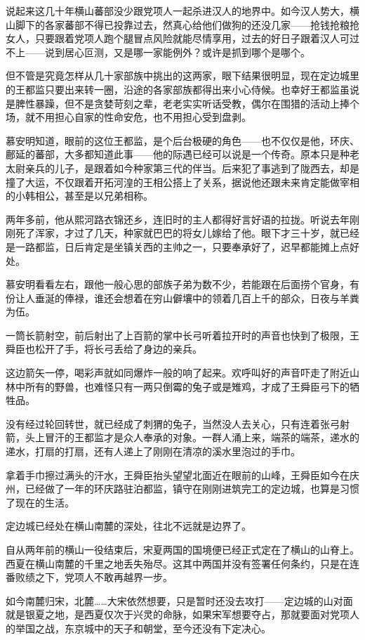 说起来这几十年横山蕃部没少跟党项人一起杀进汉人的地界中。如今汉人势大，横山脚下的各家蕃部不得已投靠过去，然真心给他们做狗的还没几家——抢钱抢粮抢女人，只要跟着党项人跑个腿冒点风险就能尽情享用，过去的好日子跟着汉人可过不上——说到居心叵测，又是哪一家能例外？或许是抓到哪个是哪个。

但不管是究竟怎样从几十家部族中挑出的这两家，眼下结果很明显，现在定边城里的王都监只要出来转一圈，沿途的各家部族都得出来小心侍候。也幸好王都监虽说是脾性暴躁，但不是贪婪苛刻之辈，老老实实听话受教，偶尔在围猎的活动上捧个场，就不用担心自家的性命安危，也不用担心受到盘剥。

慕安明知道，眼前的这位王都监，是个后台极硬的角色——也不仅仅是他，环庆、鄜延的蕃部，大多都知道此事——他的际遇已经可以说是一个传奇。原本只是种老太尉亲兵的儿子，是跟着如今种家第三代的伴当。后来犯了事逃到了陇西去，却是撞了大运，不仅跟着开拓河湟的王相公搭上了关系，据说他还跟未来肯定能做宰相的小韩相公，甚至是以兄弟相称。

两年多前，他从熙河路衣锦还乡，连旧时的主人都得好言好语的拉拢。听说去年刚刚死了浑家，才过了几天，种家就巴巴的将女儿嫁给了他。眼下才三十岁，就已经是一路都监，日后肯定是坐镇关西的主帅之一，只要奉承好了，迟早都能摊上点好处。

慕安明看看左右，跟他一般心思的部族子弟为数不少，若能跟在后面捞个官身，有份让人垂涎的俸禄，谁还会想着在穷山僻壤中的领着几百上千的部众，日夜与羊粪为伍。

一筒长箭射空，前后射出了上百箭的掌中长弓听着拉开时的声音也快到了极限，王舜臣也松开了手，将长弓丢给了身边的亲兵。

这边箭矢一停，喝彩声就如同爆炸一般的响了起来。欢呼叫好的声音吓走了附近山林中所有的野兽，也难怪只有一两只倒霉的兔子或是雉鸡，才成了王舜臣弓下的牺牲品。

没有经过轮回转世，就已经成了刺猬的兔子，当然没人去关心，只有连着张弓射箭，头上冒汗的王都监才是众人奉承的对象。一群人涌上来，端茶的端茶，递水的递水，打扇的打扇，还有人递上了刚刚在清凉的溪水里泡过的手巾。

拿着手巾擦过满头的汗水，王舜臣抬头望望北面近在眼前的山峰，王舜臣如今在庆州，已经做了一年的环庆路驻泊都监，镇守在刚刚进筑完工的定边城，也算是习惯了现在的生活。

定边城已经处在横山南麓的深处，往北不远就是边界了。

自从两年前的横山一役结束后，宋夏两国的国境便已经正式定在了横山的山脊上。西夏在横山南麓的千里之地丢失殆尽。这其中两国并没有签署任何条约，只是在连番败绩之下，党项人不敢再越界一步。

如今南麓归宋，北麓……大宋依然想要，只是暂时还没去攻打——定边城的山对面就是银夏之地，是西夏仅次于兴灵的命脉，如果宋军想要夺占，那就要面对党项人的举国之战，东京城中的天子和朝堂，至今还没有下定决心。

